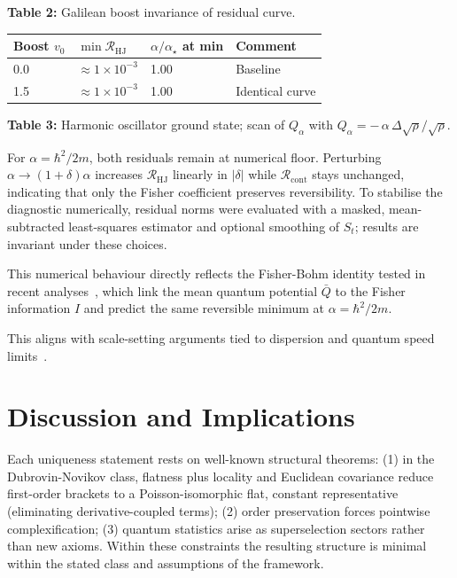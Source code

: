 \documentclass[11pt,a4paper]{article}
\numberwithin{equation}{section}
\theoremstyle{thmcompact}
\theoremstyle{remark}
\begin{document}
\vspace{5mm}

\textbf{Table 2:} Galilean boost invariance of residual curve.
\begin{center}
	\begin{tabular}{@{}llll@{}}
		\toprule
		Boost $v_0$ & $\min \mathcal{R}_{\mathrm{HJ}}$ & $\alpha/\alpha_\star$ at min & Comment \\
		\midrule
		0.0 & $\approx 1\times10^{-3}$ & 1.00 & Baseline \\
		1.5 & $\approx 1\times10^{-3}$ & 1.00 & Identical curve \\
		\bottomrule
	\end{tabular}
\end{center}

\vspace{5mm}

\textbf{Table 3:} Harmonic oscillator ground state; scan of $Q_\alpha$ with $Q_\alpha=-\,\alpha\,\Delta\sqrt{\rho}/\sqrt{\rho}$.

For $\alpha=\hbar^2/2m$, both residuals remain at numerical floor. Perturbing $\alpha\!\to\!(1+\delta)\alpha$ increases $\mathcal{R}_{\mathrm{HJ}}$ linearly in $|\delta|$ while $\mathcal{R}_{\mathrm{cont}}$ stays unchanged, indicating that only the Fisher coefficient preserves reversibility.
To stabilise the diagnostic numerically, residual norms were evaluated with a masked, mean-subtracted least-squares estimator and optional smoothing of $S_t$; results are invariant under these choices.

This numerical behaviour directly reflects the Fisher-Bohm identity tested in recent analyses~\cite{bloch2022}, which link the mean quantum potential $\bar Q$ to the Fisher information $I$ and predict the same reversible minimum at $\alpha=\hbar^2/2m$.

This aligns with scale-setting arguments tied to dispersion and quantum speed limits~\cite{giovannetti2003}.

	\section{Discussion and Implications}
	
Each uniqueness statement rests on well-known structural theorems:  
(1) in the Dubrovin-Novikov class, flatness plus locality and Euclidean covariance reduce first-order brackets to a Poisson-isomorphic flat, constant representative (eliminating derivative-coupled terms);  
(2) order preservation forces pointwise complexification;  
(3) quantum statistics arise as superselection sectors rather than new axioms.  
Within these constraints the resulting structure is minimal within the stated class and assumptions of the framework.
	
\end{document}
